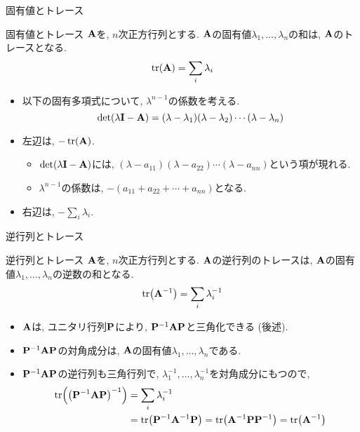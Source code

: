 \documentclass[dvipdfmx,notheorems,t]{beamer}
\begin{document}
\begin{frame}{固有値とトレース}
\begin{block}{固有値とトレース}
  $\vb{A}$を, $n$次正方行列とする.
  $\vb{A}$の固有値$\lambda_1, \ldots, \lambda_n$の和は, $\vb{A}$のトレースとなる.
  $$\tr(\vb{A}) = \sum_i \lambda_i$$
\end{block}

\begin{itemize}
  \item 以下の固有多項式について, $\lambda^{n - 1}$の係数を考える.
  $$\det(\lambda \vb{I} - \vb{A}) = (\lambda - \lambda_1) (\lambda - \lambda_2) \cdots (\lambda - \lambda_n)$$
  \item 左辺は, $-\tr(\vb{A})$.
  \begin{itemize}
    \item $\det(\lambda \vb{I} - \vb{A})$には, $\left( \lambda - a_{11} \right)
    \left( \lambda - a_{22} \right) \cdots \left( \lambda - a_{nn} \right)$という項が現れる.
    \item $\lambda^{n - 1}$の係数は, $-(a_{11} + a_{22} + \cdots + a_{nn})$となる.
  \end{itemize}
  \item 右辺は, $-\sum_i \lambda_i$.
\end{itemize}
\end{frame}

\begin{frame}{逆行列とトレース}
\begin{block}{逆行列とトレース}
  $\vb{A}$を, $n$次正方行列とする.
  $\vb{A}$の逆行列のトレースは, $\vb{A}$の固有値$\lambda_1, \ldots, \lambda_n$の逆数の和となる.
  $$\tr(\vb{A}^{-1}) = \sum_i \lambda_i^{-1}$$
\end{block}

\begin{itemize}
  \item $\vb{A}$は, ユニタリ行列$\vb{P}$により, $\vb{P}^{-1} \vb{A} \vb{P}$と三角化できる (後述).
  \item $\vb{P}^{-1} \vb{A} \vb{P}$の対角成分は, $\vb{A}$の固有値$\lambda_1, \ldots, \lambda_n$である.
  \item $\vb{P}^{-1} \vb{A} \vb{P}$の逆行列も三角行列で, $\lambda_1^{-1}, \ldots, \lambda_n^{-1}$を対角成分にもつので,
  \begin{align*}
    \tr(\left( \vb{P}^{-1} \vb{A} \vb{P} \right)^{-1}) &= \sum_i \lambda_i^{-1} \\
      &= \tr(\vb{P}^{-1} \vb{A}^{-1} \vb{P}) = \tr(\vb{A}^{-1} \vb{P} \vb{P}^{-1}) = \tr(\vb{A}^{-1})
  \end{align*}
\end{itemize}
\end{frame}
\end{document}
